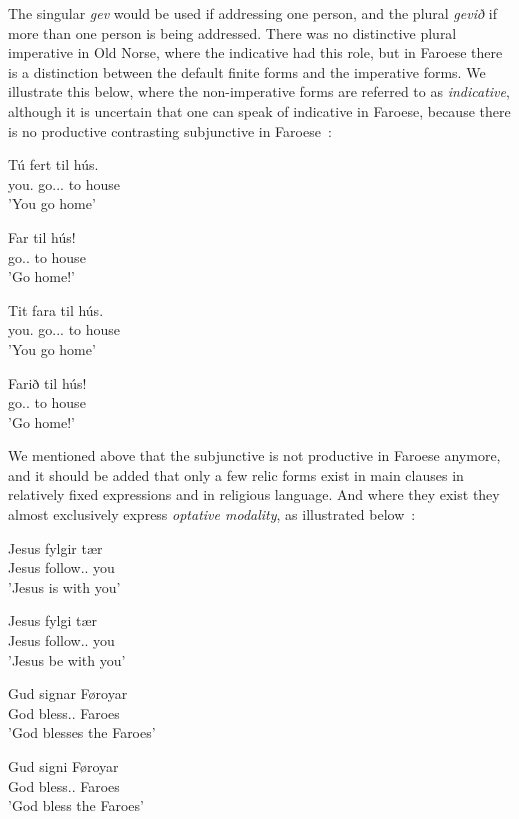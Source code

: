 \documentclass[12pt,%
]{lin-v2/lin}
\begin{document}
The singular \emph{gev} would be used if addressing one person, and the plural \emph{gevið} if more than one person
is being addressed. There was no distinctive plural imperative in Old Norse, where the \Second\Pl{} indicative had this role,
but in Faroese there is a distinction between the default finite forms and the imperative forms. We illustrate this below,
where the non-imperative forms are referred to as \emph{indicative}, although it is uncertain that one can speak of indicative
in Faroese, because there is no productive contrasting subjunctive in Faroese~\citep[67-68]{faroese}:
\begin{exe}
    \ex
    \begin{xlist}
        \item \gll Tú fert til hús.\\
        you.\Second\Sg{} go.\Second\Sg.\Prs.\Ind{} to house\\
        \trans 'You go home'
        \item \gll Far til hús!\\
        go.\Second\Sg.\Imp{} to house\\
        \trans 'Go home!'
        \item \gll Tit fara til hús.\\
        you.\Second\Pl{} go.\Second\Pl.\Prs.\Ind{} to house\\
        \trans 'You go home'
        \item \gll Farið til hús!\\
        go.\Second\Pl.\Imp{} to house\\
        \trans 'Go home!'
    \end{xlist}
\end{exe}

We mentioned above that the subjunctive is not productive in Faroese anymore, and it should be added that only
a few relic forms exist in main clauses in relatively fixed expressions and in religious language. And where they
exist they almost exclusively express \emph{optative modality}, as illustrated below~\citep[68]{faroese}:
\begin{exe}
    \ex
    \begin{xlist}
        \item \gll Jesus fylgir tær\\
        Jesus follow.\Third\Sg.\Ind{} you\\
        \trans 'Jesus is with you'
        \item \gll Jesus fylgi tær\\
        Jesus follow.\Third\Sg.\Subj{} you\\
        \trans 'Jesus be with you' 
        \item \gll Gud signar Føroyar\\
        God bless.\Third\Pl.\Ind{} Faroes\\
        \trans 'God blesses the Faroes'
        \item \gll Gud signi Føroyar\\
        God bless.\Third\Pl.\Subj{} Faroes\\
        \trans 'God bless the Faroes'
    \end{xlist}
\end{exe}
\end{document}
